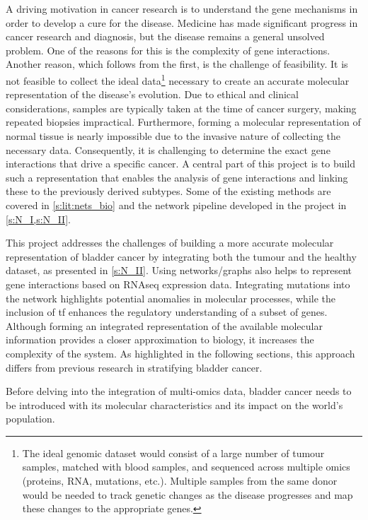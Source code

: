 A driving motivation in cancer research is to understand the gene mechanisms in order to develop a cure for the disease. Medicine has made significant progress in cancer research and diagnosis, but the disease remains a general unsolved problem. One of the reasons for this is the complexity of gene interactions. Another reason, which follows from the first, is the challenge of feasibility. It is not feasible to collect the ideal data\footnote{The ideal genomic dataset would consist of a large number of tumour samples, matched with blood samples, and sequenced across multiple omics (proteins, RNA, mutations, etc.). Multiple samples from the same donor would be needed to track genetic changes as the disease progresses and map these changes to the appropriate genes.} necessary to create an accurate molecular representation of the disease's evolution. Due to ethical and clinical considerations, samples are typically taken at the time of cancer surgery, making repeated biopsies impractical. Furthermore, forming a molecular representation of normal tissue is nearly impossible due to the invasive nature of collecting the necessary data. Consequently, it is challenging to determine the exact gene interactions that drive a specific cancer. A central part of this project is to build such a representation that enables the analysis of gene interactions and linking these to the previously derived subtypes. Some of the existing methods are covered in \cref{s:lit:nets_bio} and the network pipeline developed in the project in \cref{s:N_I,s:N_II}.

This project addresses the challenges of building a more accurate molecular representation of bladder cancer by integrating both the tumour and the healthy dataset, as presented in \cref{s:N_II}. Using networks/graphs also helps to represent gene interactions based on RNAseq expression data. Integrating mutations into the network highlights potential anomalies in molecular processes, while the inclusion of \acrshort{tf} enhances the regulatory understanding of a subset of genes. Although forming an integrated representation of the available molecular information provides a closer approximation to biology, it increases the complexity of the system. As highlighted in the following sections, this approach differs from previous research in stratifying bladder cancer.


Before delving into the integration of multi-omics data, bladder cancer needs to be introduced with its molecular characteristics and its impact on the world's population.


